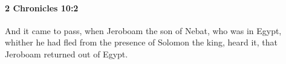 
		\paragraph{2 Chronicles 10:2} %
			\label{2CHRONICLES-10-2}

			And it came to pass, when Jeroboam the son of Nebat, who was in Egypt, whither he had fled from the presence of Solomon the king, heard it, that Jeroboam returned out of Egypt.


